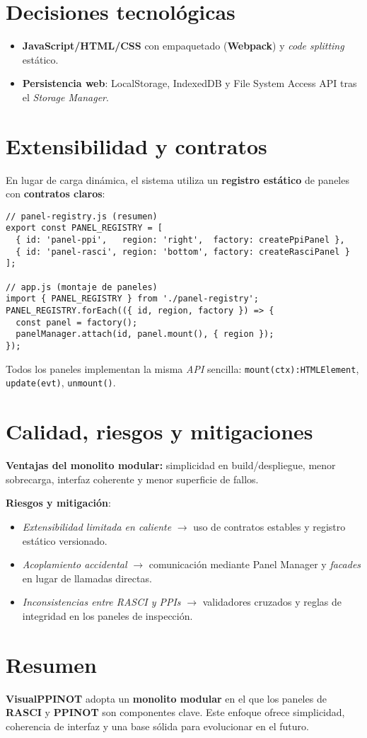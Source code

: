 \section{Decisiones tecnológicas}
\label{subsec:tecnologia}
\begin{itemize}
  \item \textbf{JavaScript/HTML/CSS} con empaquetado (\textbf{Webpack}) y \emph{code splitting} estático.
  \item \textbf{Persistencia web}: LocalStorage, IndexedDB y File System Access API tras el \textit{Storage Manager}.
\end{itemize}

\section{Extensibilidad y contratos}
\label{subsec:extensibilidad}
En lugar de carga dinámica, el sistema utiliza un \textbf{registro estático} de paneles con \textbf{contratos claros}:

\begin{verbatim}
// panel-registry.js (resumen)
export const PANEL_REGISTRY = [
  { id: 'panel-ppi',   region: 'right',  factory: createPpiPanel },
  { id: 'panel-rasci', region: 'bottom', factory: createRasciPanel }
];

// app.js (montaje de paneles)
import { PANEL_REGISTRY } from './panel-registry';
PANEL_REGISTRY.forEach(({ id, region, factory }) => {
  const panel = factory();
  panelManager.attach(id, panel.mount(), { region });
});
\end{verbatim}

Todos los paneles implementan la misma \emph{API} sencilla:  
\texttt{mount(ctx):HTMLElement}, \texttt{update(evt)}, \texttt{unmount()}.

\section{Calidad, riesgos y mitigaciones}
\label{subsec:calidad}

\textbf{Ventajas del monolito modular:} simplicidad en build/despliegue, menor sobrecarga, interfaz coherente y menor superficie de fallos.

\medskip
\noindent\textbf{Riesgos y mitigación}:
\begin{itemize}
  \item \emph{Extensibilidad limitada en caliente} $\rightarrow$ uso de contratos estables y registro estático versionado.
  \item \emph{Acoplamiento accidental} $\rightarrow$ comunicación mediante Panel Manager y \emph{facades} en lugar de llamadas directas.
  \item \emph{Inconsistencias entre RASCI y PPIs} $\rightarrow$ validadores cruzados y reglas de integridad en los paneles de inspección.
\end{itemize}

\section{Resumen}
\label{subsec:resumen}
\textbf{VisualPPINOT} adopta un \textbf{monolito modular} en el que los paneles de \textbf{RASCI} y \textbf{PPINOT} son componentes clave. Este enfoque ofrece simplicidad, coherencia de interfaz y una base sólida para evolucionar en el futuro.
